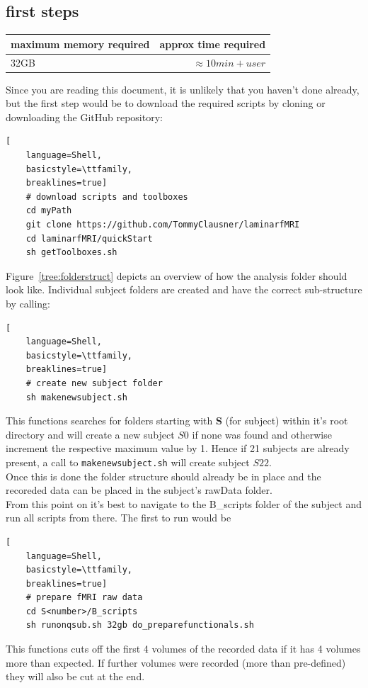 \documentclass[12pt,a4paper]{scrartcl}
\begin{document}
\subsection{first steps}
\begin{table}[h]
\begin{tabular}{l | r}
\toprule
maximum memory required & approx time required\\\toprule
32GB & $\approx 10min+user$ \\\bottomrule
\end{tabular}
\end{table}
\FloatBarrier
\noindent Since you are reading this document, it is unlikely that you haven't done already, but the first step would be to download the required scripts by cloning or downloading the GitHub repository:
\begin{lstlisting}[
    language=Shell,
    basicstyle=\ttfamily,
    breaklines=true]
    # download scripts and toolboxes
    cd myPath
    git clone https://github.com/TommyClausner/laminarfMRI
    cd laminarfMRI/quickStart
    sh getToolboxes.sh
\end{lstlisting}
Figure~\ref{tree:folderstruct} depicts an overview of how the analysis folder should look like. Individual subject folders are created and have the correct sub-structure by calling:
\begin{lstlisting}[
    language=Shell,
    basicstyle=\ttfamily,
    breaklines=true]
    # create new subject folder
    sh makenewsubject.sh
 \end{lstlisting}
This functions searches for folders starting with \textbf{S} (for subject) within it's root directory and will create a new subject $S0$ if none was found and otherwise increment the respective maximum value by 1. Hence if 21 subjects are already present, a call to \texttt{makenewsubject.sh} will create subject $S22$.\\
Once this is done the folder structure should already be in place and the recoreded data can be placed in the subject's rawData folder.\\
From this point on it's best to navigate to the B\_scripts folder of the subject and run all scripts from there. The first to run would be
\begin{lstlisting}[
    language=Shell,
    basicstyle=\ttfamily,
    breaklines=true]
    # prepare fMRI raw data
    cd S<number>/B_scripts
    sh runonqsub.sh 32gb do_preparefunctionals.sh
\end{lstlisting}
This functions cuts off the first 4 volumes of the recorded data if it has 4 volumes more than expected. If further volumes were recorded (more than pre-defined) they will also be cut at the end.
\end{document}
